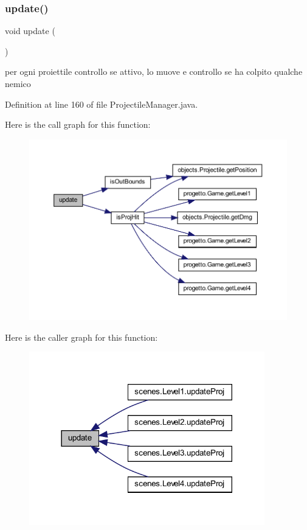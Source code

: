 \subsubsection{\texorpdfstring{update()}{update()}}
{\footnotesize\ttfamily void update (\begin{DoxyParamCaption}{ }\end{DoxyParamCaption})}



per ogni proiettile controllo se attivo, lo muove e controllo se ha colpito qualche nemico 



Definition at line 160 of file Projectile\+Manager.\+java.

Here is the call graph for this function\+:
\nopagebreak
\begin{figure}[H]
\begin{center}
\leavevmode
\includegraphics[width=350pt]{classmanagers_1_1_projectile_manager_ac5c54df7ed3b930268c8d7752c101725_cgraph}
\end{center}
\end{figure}
Here is the caller graph for this function\+:\nopagebreak
\begin{figure}[H]
\begin{center}
\leavevmode
\includegraphics[width=290pt]{classmanagers_1_1_projectile_manager_ac5c54df7ed3b930268c8d7752c101725_icgraph}
\end{center}
\end{figure}


